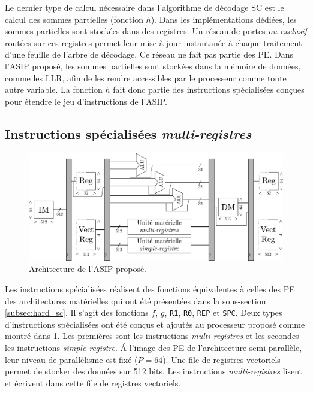 Le dernier type de calcul nécessaire dans l'algorithme de décodage SC est le calcul des sommes partielles (fonction $h$). Dans les implémentations dédiées, les sommes partielles sont stockées dans des registres. Un réseau de portes \textit{ou-exclusif} routées sur ces registres permet leur mise à jour instantanée à chaque traitement d'une feuille de l'arbre de décodage. Ce réseau ne fait pas partie des PE. Dans l'ASIP proposé, les sommes partielles sont stockées dans la mémoire de données, comme les LLR, afin de les rendre accessibles par le processeur comme toute autre variable. La fonction $h$ fait donc partie des instructions spécialisées conçues pour étendre le jeu d'instructions de l'ASIP.

\subsection{Instructions spécialisées \textit{multi-registres}}
\label{subsec:multi_reg}

\begin{figure}
\centering
\includegraphics[width=\textwidth]{main/ch3_fig/full_tensilica}
\caption{Architecture de l'ASIP proposé.}
\label{fig:full_tensilica}
\end{figure}

Les instructions spécialisées réalisent des fonctions équivalentes à celles des PE des architectures matérielles qui ont été présentées dans la sous-section \ref{subsec:hard_sc}. Il s'agit des fonctions $f$, $g$, \texttt{R1}, \texttt{R0}, \texttt{REP} et \texttt{SPC}. Deux types d'instructions spécialisées ont été conçus et ajoutés au processeur proposé comme montré dans \ref{fig:full_tensilica}. Les premières sont les instructions \textit{multi-registres} et les secondes les instructions \textit{simple-registre}. \'A l'image des PE de l'architecture semi-parallèle, leur niveau de parallélisme est fixé ($P=64$). Une file de registres vectoriels permet de stocker des données sur 512 bits. Les instructions \textit{multi-registres} lisent et écrivent dans cette file de registres vectoriels.

